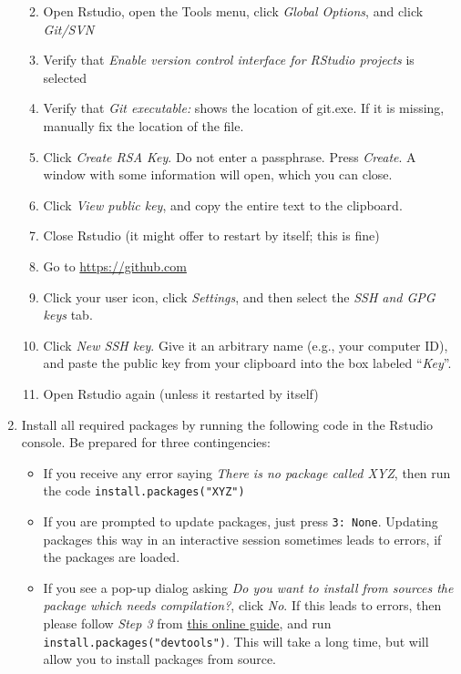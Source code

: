 \documentclass[
]{book}
\providecommand{\tightlist}{%
  \setlength{\itemsep}{0pt}\setlength{\parskip}{0pt}}
\begin{document}
\begin{enumerate}
  \begin{enumerate}
  \def\labelenumii{\alph{enumii}.}
  \tightlist
  \item
    Open Rstudio, open the Tools menu, click \emph{Global Options}, and click \emph{Git/SVN}
  \item
    Verify that \emph{Enable version control interface for RStudio projects} is selected
  \item
    Verify that \emph{Git executable:} shows the location of git.exe. If it is missing, manually fix the location of the file.
  \item
    Click \emph{Create RSA Key}. Do not enter a passphrase. Press \emph{Create}. A window with some information will open, which you can close.
  \item
    Click \emph{View public key}, and copy the entire text to the clipboard.
  \item
    Close Rstudio (it might offer to restart by itself; this is fine)
  \item
    Go to \url{https://github.com}
  \item
    Click your user icon, click \emph{Settings}, and then select the \emph{SSH and GPG keys} tab.
  \item
    Click \emph{New SSH key}. Give it an arbitrary name (e.g., your computer ID), and paste the public key from your clipboard into the box labeled ``\emph{Key}''.
  \item
    Open Rstudio again (unless it restarted by itself)
  \end{enumerate}
\item
  Install all required packages by running the following code in the Rstudio console. Be prepared for three contingencies:

  \begin{itemize}
  \tightlist
  \item
    If you receive any error saying \emph{There is no package called XYZ}, then run the code \texttt{install.packages("XYZ")}\\
  \item
    If you are prompted to update packages, just press \texttt{3:\ None}. Updating packages this way in an interactive session sometimes leads to errors, if the packages are loaded.\\
  \item
    If you see a pop-up dialog asking \emph{Do you want to install from sources the package which needs compilation?}, click \emph{No}. If this leads to errors, then please follow \emph{Step 3} from \href{https://cjvanlissa.github.io/worcs/articles/setup.html}{this online guide}, and run \texttt{install.packages("devtools")}. This will take a long time, but will allow you to install packages from source.
  \end{itemize}
\end{enumerate}
\end{document}
